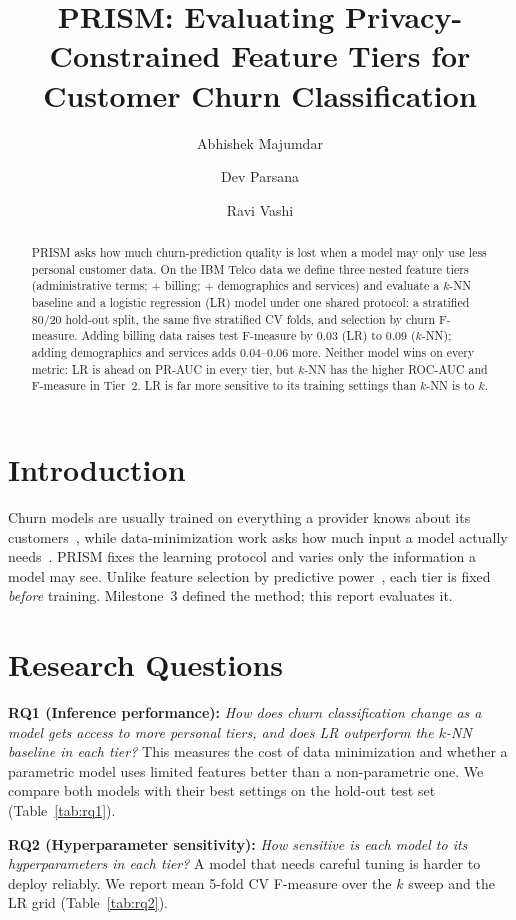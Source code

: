 \documentclass[sigconf,nonacm]{acmart}
\title{PRISM: Evaluating Privacy-Constrained Feature Tiers for Customer Churn Classification}
\author{Abhishek Majumdar}
\affiliation{\institution{University of Victoria}\city{Victoria}\country{Canada}}
\author{Dev Parsana}
\affiliation{\institution{University of Victoria}\city{Victoria}\country{Canada}}
\author{Ravi Vashi}
\affiliation{\institution{University of Victoria}\city{Victoria}\country{Canada}}
\begin{document}
\begin{abstract}
PRISM asks how much churn-prediction quality is lost when a model may only use less personal customer data. On the IBM Telco data we define three nested feature tiers (administrative terms; + billing; + demographics and services) and evaluate a $k$-NN baseline and a logistic regression (LR) model under one shared protocol: a stratified 80/20 hold-out split, the same five stratified CV folds, and selection by churn F-measure. Adding billing data raises test F-measure by 0.03 (LR) to 0.09 ($k$-NN); adding demographics and services adds 0.04--0.06 more. Neither model wins on every metric: LR is ahead on PR-AUC in every tier, but $k$-NN has the higher ROC-AUC and F-measure in Tier~2. LR is far more sensitive to its training settings than $k$-NN is to $k$.
\end{abstract}
\maketitle

\section{Introduction}
Churn models are usually trained on everything a provider knows about its customers~\cite{mozer,neslin}, while data-minimization work asks how much input a model actually needs~\cite{goldsteen}. PRISM fixes the learning protocol and varies only the information a model may see. Unlike feature selection by predictive power~\cite{omari}, each tier is fixed \emph{before} training. Milestone~3 defined the method; this report evaluates it.

\section{Research Questions}
\textbf{RQ1 (Inference performance):} \emph{How does churn classification change as a model gets access to more personal tiers, and does LR outperform the $k$-NN baseline in each tier?} This measures the cost of data minimization and whether a parametric model uses limited features better than a non-parametric one. We compare both models with their best settings on the hold-out test set (Table~\ref{tab:rq1}).

\textbf{RQ2 (Hyperparameter sensitivity):} \emph{How sensitive is each model to its hyperparameters in each tier?} A model that needs careful tuning is harder to deploy reliably. We report mean 5-fold CV F-measure over the $k$ sweep and the LR grid (Table~\ref{tab:rq2}).
\end{document}
